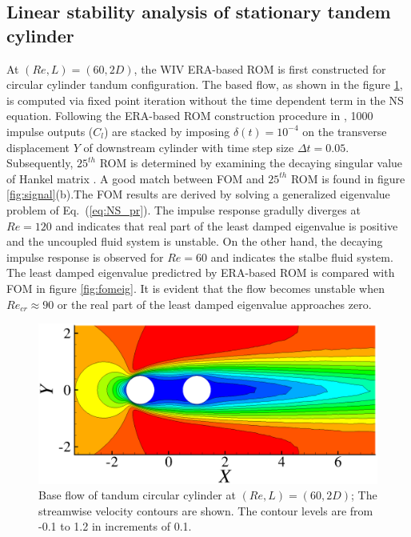 \subsection{ Linear stability analysis of stationary tandem cylinder}\label{sec:lsa}

At $(Re,L)=(60,2D)$, the WIV ERA-based ROM is first constructed for circular cylinder 
tandum configuration. The based flow, as shown in the figure \ref{fig:baseflow}, is computed via fixed point iteration without the 
time dependent term in the NS equation. 
Following the ERA-based ROM construction procedure in \cite{yao_jfm_1}, 
1000 impulse outputs ($C_l$) are stacked by imposing $\delta (t) = 10^{-4}$
on the transverse displacement $Y$ of downstream cylinder with time step size $\Delta t = 0.05$.
Subsequently, $25^{th}$ ROM is determined by examining the decaying singular value of Hankel matrix \cite{Juang1985}. 
A good match between FOM and $25^{th}$ ROM is found in figure \ref{fig:signal}(b).The FOM results 
are derived by solving a generalized eigenvalue problem of Eq.~(\ref{eq:NS_pr}).
The impulse response gradully diverges at $Re=120$
and indicates that real part of the least damped eigenvalue is positive and the uncoupled fluid system is unstable. 
On the other hand, the decaying impulse response is observed for $Re=60$ and indicates the stalbe fluid system. 
%
The least damped eigenvalue predictred by ERA-based ROM is compared with FOM in figure \ref{fig:fomeig}. 
It is evident that the flow becomes unstable 
when $Re_{cr} \approx 90$ or the real part of the least damped eigenvalue approaches zero. 


\begin{figure}
	 \centering
	 \includegraphics[scale=0.5]{baseflow_re60_ld2}
     \caption{Base flow of tandum circular cylinder at $(Re,L)=(60,2D)$; The 
     streamwise velocity contours are shown. The contour levels are from -0.1 to 1.2 
     in increments of 0.1.}
\label{fig:baseflow}
\end{figure}


